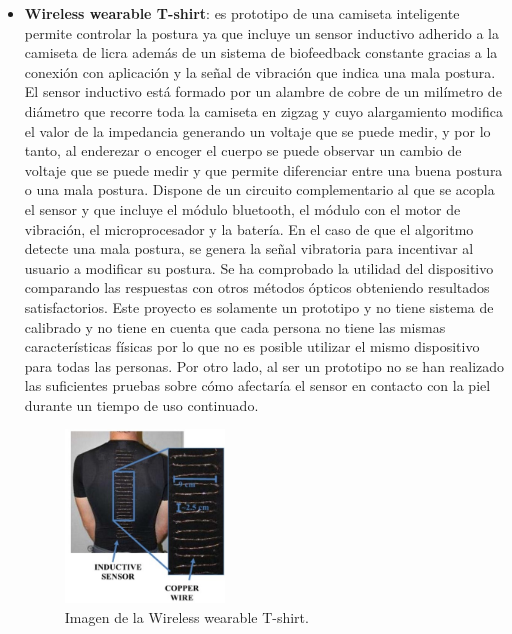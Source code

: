 \begin{itemize}
    \item \textbf{Wireless wearable T-shirt}\cite{wirelessT-shirt}: es prototipo de una camiseta inteligente permite controlar la postura ya que incluye un sensor inductivo adherido a la camiseta de licra además de un sistema de biofeedback constante gracias a la conexión con aplicación y la señal de vibración que indica una mala postura. El sensor inductivo está formado por un alambre de cobre de un milímetro de diámetro que recorre toda la camiseta en zigzag y cuyo alargamiento modifica el valor de la impedancia generando un voltaje que se puede medir, y por lo tanto, al enderezar o encoger el cuerpo se puede observar un cambio de voltaje que se puede medir y que permite diferenciar entre una buena postura o una mala postura. Dispone de un circuito complementario al que se acopla el sensor y que incluye el módulo bluetooth, el módulo con el motor de vibración, el microprocesador y la batería. En el caso de que el algoritmo detecte una mala postura, se genera la señal vibratoria para incentivar al usuario a modificar su postura. Se ha comprobado la utilidad del dispositivo comparando las respuestas con otros métodos ópticos obteniendo resultados satisfactorios. Este proyecto es solamente un prototipo y no tiene sistema de calibrado y no tiene en cuenta que cada persona no tiene las mismas características físicas por lo que no es posible utilizar el mismo dispositivo para todas las personas. Por otro lado, al ser un prototipo no se han realizado las suficientes pruebas sobre cómo afectaría el sensor en contacto con la piel durante un tiempo de uso continuado.
\begin{figure}[h!]
    \centering
    \includegraphics[width=0.4\textwidth]{img/imgWeaTshirt.jpg}
    \caption{Imagen de la Wireless wearable T-shirt.\cite{wirelessT-shirt}}
    \label{fig:imgWeaTshirt} 
\end{figure}


\end{itemize}
